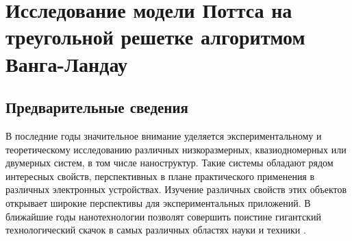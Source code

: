 

\section{Исследование модели Поттса на треугольной решетке алгоритмом Ванга-Ландау}



%
%
%




\subsection{Предварительные сведения}


В последние годы  значительное внимание уделяется экспериментальному и теоретическому исследованию различных низкоразмерных, квазиодномерных или двумерных систем, в том числе наноструктур. Такие системы обладают рядом интересных свойств, перспективных в плане практического применения в различных электронных устройствах. Изучение различных свойств этих объектов открывает широкие перспективы для экспериментальных приложений. В ближайшие годы нанотехнологии позволят совершить поистине гигантский технологический скачок в самых различных областях науки и техники \cite{ph3_1}.

